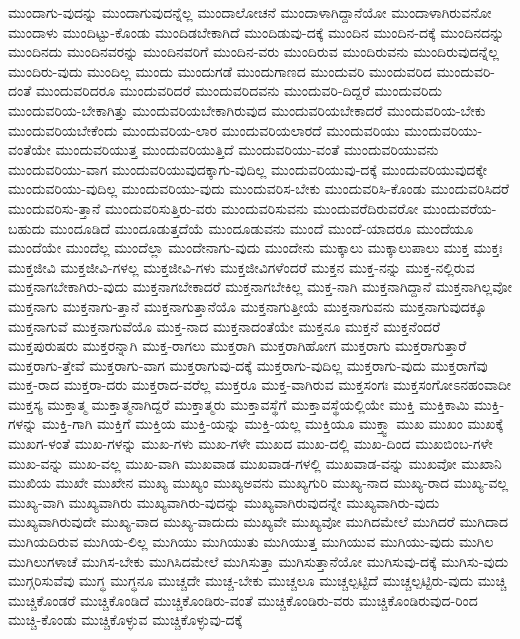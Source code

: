 {ಮುಂದಾಗು-ವುದನ್ನು
ಮುಂದಾಗುವುದನ್ನೆಲ್ಲ
ಮುಂದಾಲೋಚನೆ
ಮುಂದಾಳಾಗಿದ್ದಾನೆಯೋ
ಮುಂದಾಳಾಗಿರುವನೋ
ಮುಂದಾಳು
ಮುಂದಿಟ್ಟು-ಕೊಂಡು
ಮುಂದಿಡಬೇಕಾಗಿದೆ
ಮುಂದಿಡುವು-ದಕ್ಕೆ
ಮುಂದಿನ
ಮುಂದಿನ-ದಕ್ಕೆ
ಮುಂದಿನದನ್ನು
ಮುಂದಿನದು
ಮುಂದಿನವರನ್ನು
ಮುಂದಿನವರಿಗೆ
ಮುಂದಿನ-ವರು
ಮುಂದಿರುವ
ಮುಂದಿರುವನು
ಮುಂದಿರುವುದನ್ನೆಲ್ಲ
ಮುಂದಿರು-ವುದು
ಮುಂದಿಲ್ಲ
ಮುಂದು
ಮುಂದುಗಡೆ
ಮುಂದುಗಾಣದ
ಮುಂದುವರಿ
ಮುಂದುವರಿದ
ಮುಂದುವರಿ-ದಂತೆ
ಮುಂದುವರಿದರೂ
ಮುಂದುವರಿದರೆ
ಮುಂದುವರಿದವನು
ಮುಂದುವರಿ-ದಿದ್ದರೆ
ಮುಂದುವರಿದು
ಮುಂದುವರಿಯ-ಬೇಕಾಗಿತ್ತು
ಮುಂದುವರಿಯಬೇಕಾಗಿರುವುದ
ಮುಂದುವರಿಯಬೇಕಾದರೆ
ಮುಂದುವರಿಯ-ಬೇಕು
ಮುಂದುವರಿಯಬೇಕೆಂದು
ಮುಂದುವರಿಯ-ಲಾರ
ಮುಂದುವರಿಯಲಾರದೆ
ಮುಂದುವರಿಯು
ಮುಂದುವರಿಯು-ವಂತೆಯೇ
ಮುಂದುವರಿಯುತ್ತ
ಮುಂದುವರಿಯುತ್ತಿದೆ
ಮುಂದುವರಿಯು-ವಂತೆ
ಮುಂದುವರಿಯುವನು
ಮುಂದುವರಿಯು-ವಾಗ
ಮುಂದುವರಿಯುವುದಕ್ಕಾಗು-ವುದಿಲ್ಲ
ಮುಂದುವರಿಯುವು-ದಕ್ಕೆ
ಮುಂದುವರಿಯುವುದಕ್ಕೇ
ಮುಂದುವರಿಯು-ವುದಿಲ್ಲ
ಮುಂದುವರಿಯು-ವುದು
ಮುಂದುವರಿಸ-ಬೇಕು
ಮುಂದುವರಿಸಿ-ಕೊಂಡು
ಮುಂದುವರಿಸಿದರೆ
ಮುಂದುವರಿಸು-ತ್ತಾನೆ
ಮುಂದುವರಿಸುತ್ತಿರು-ವರು
ಮುಂದುವರಿಸುವನು
ಮುಂದುವರೆದಿರುವರೋ
ಮುಂದುವರೆಯ-ಬಹುದು
ಮುಂದೂಡಿದೆ
ಮುಂದೂಡುತ್ತದೆಯೆ
ಮುಂದೂಡುವನು
ಮುಂದೆ
ಮುಂದೆ-ಯಾದರೂ
ಮುಂದೆಯೂ
ಮುಂದೆಯೇ
ಮುಂದೆಲ್ಲ
ಮುಂದೆಲ್ಲಾ
ಮುಂದೇನಾಗು-ವುದು
ಮುಂದೇನು
ಮುಕ್ಕಾಲು
ಮುಕ್ಕಾಲುಪಾಲು
ಮುಕ್ತ
ಮುಕ್ತಃ
ಮುಕ್ತಜೀವಿ
ಮುಕ್ತಜೀವಿ-ಗಳಲ್ಲ
ಮುಕ್ತಜೀವಿ-ಗಳು
ಮುಕ್ತಜೀವಿಗಳೆಂದರೆ
ಮುಕ್ತನ
ಮುಕ್ತ-ನನ್ನು
ಮುಕ್ತ-ನಲ್ಲಿರುವ
ಮುಕ್ತನಾಗಬೇಕಾಗಿರು-ವುದು
ಮುಕ್ತನಾಗಬೇಕಾದರೆ
ಮುಕ್ತನಾಗಬೇಕಿಲ್ಲ
ಮುಕ್ತ-ನಾಗಿ
ಮುಕ್ತನಾಗಿದ್ದಾನೆ
ಮುಕ್ತನಾಗಿಲ್ಲವೋ
ಮುಕ್ತನಾಗು
ಮುಕ್ತನಾಗು-ತ್ತಾನೆ
ಮುಕ್ತನಾಗುತ್ತಾನೆಯೊ
ಮುಕ್ತನಾಗುತ್ತೀಯೆ
ಮುಕ್ತನಾಗುವನು
ಮುಕ್ತನಾಗುವುದಕ್ಕೂ
ಮುಕ್ತನಾಗುವೆ
ಮುಕ್ತನಾಗುವೆಯೊ
ಮುಕ್ತ-ನಾದ
ಮುಕ್ತನಾದಂತೆಯೇ
ಮುಕ್ತನೂ
ಮುಕ್ತನೆ
ಮುಕ್ತನೆಂದರೆ
ಮುಕ್ತಪುರುಷರು
ಮುಕ್ತರನ್ನಾಗಿ
ಮುಕ್ತ-ರಾಗಲು
ಮುಕ್ತರಾಗಿ
ಮುಕ್ತರಾಗಿಹೋಗ
ಮುಕ್ತರಾಗು
ಮುಕ್ತರಾಗುತ್ತಾರೆ
ಮುಕ್ತರಾಗು-ತ್ತೇವೆ
ಮುಕ್ತರಾಗು-ವಾಗ
ಮುಕ್ತರಾಗುವು-ದಕ್ಕೆ
ಮುಕ್ತರಾಗು-ವುದಿಲ್ಲ
ಮುಕ್ತರಾಗು-ವುದು
ಮುಕ್ತರಾಗೆವು
ಮುಕ್ತ-ರಾದ
ಮುಕ್ತರಾ-ದರು
ಮುಕ್ತರಾದ-ವರೆಲ್ಲ
ಮುಕ್ತರೂ
ಮುಕ್ತ-ವಾಗಿರುವ
ಮುಕ್ತಸಂಗಃ
ಮುಕ್ತಸಂಗೋಽನಹಂವಾದೀ
ಮುಕ್ತಸ್ಯ
ಮುಕ್ತಾತ್ಮ
ಮುಕ್ತಾತ್ಮನಾಗಿದ್ದರೆ
ಮುಕ್ತಾತ್ಮರು
ಮುಕ್ತಾವಸ್ಥೆಗೆ
ಮುಕ್ತಾವಸ್ಥೆಯಲ್ಲಿಯೇ
ಮುಕ್ತಿ
ಮುಕ್ತಿಕಾಮಿ
ಮುಕ್ತಿ-ಗಳನ್ನು
ಮುಕ್ತಿ-ಗಾಗಿ
ಮುಕ್ತಿಗೆ
ಮುಕ್ತಿಯ
ಮುಕ್ತಿ-ಯನ್ನು
ಮುಕ್ತಿ-ಯಲ್ಲ
ಮುಕ್ತಿಯೂ
ಮುಕ್ತ್ವಾ
ಮುಖ
ಮುಖಂ
ಮುಖಕ್ಕೆ
ಮುಖಗ-ಳಂತೆ
ಮುಖ-ಗಳನ್ನು
ಮುಖ-ಗಳು
ಮುಖ-ಗಳೇ
ಮುಖದ
ಮುಖ-ದಲ್ಲಿ
ಮುಖ-ದಿಂದ
ಮುಖಬಿಂಬ-ಗಳೇ
ಮುಖ-ವನ್ನು
ಮುಖ-ವಲ್ಲ
ಮುಖ-ವಾಗಿ
ಮುಖವಾಡ
ಮುಖವಾಡ-ಗಳಲ್ಲಿ
ಮುಖವಾಡ-ವನ್ನು
ಮುಖವೋ
ಮುಖಾನಿ
ಮುಖಿಯ
ಮುಖೇ
ಮುಖೇನ
ಮುಖ್ಯ
ಮುಖ್ಯಂ
ಮುಖ್ಯಅವನು
ಮುಖ್ಯಗುರಿ
ಮುಖ್ಯ-ನಾದ
ಮುಖ್ಯ-ರಾದ
ಮುಖ್ಯ-ವಲ್ಲ
ಮುಖ್ಯ-ವಾಗಿ
ಮುಖ್ಯವಾಗಿರು
ಮುಖ್ಯವಾಗಿರು-ವುದನ್ನು
ಮುಖ್ಯವಾಗಿರುವುದನ್ನೇ
ಮುಖ್ಯವಾಗಿರು-ವುದು
ಮುಖ್ಯವಾಗಿರುವುದೇ
ಮುಖ್ಯ-ವಾದ
ಮುಖ್ಯ-ವಾದುದು
ಮುಖ್ಯವೇ
ಮುಖ್ಯವೋ
ಮುಗಿದಮೇಲೆ
ಮುಗಿದರೆ
ಮುಗಿದಾದ
ಮುಗಿಯದಿರುವ
ಮುಗಿಯ-ಲಿಲ್ಲ
ಮುಗಿಯು
ಮುಗಿಯುತು
ಮುಗಿಯುತ್ತ
ಮುಗಿಯುವ
ಮುಗಿಯು-ವುದು
ಮುಗಿಲ
ಮುಗಿಲುಗಳಾಚೆ
ಮುಗಿಸ-ಬೇಕು
ಮುಗಿಸಿದಮೇಲೆ
ಮುಗಿಸುತ್ತಾ
ಮುಗಿಸುತ್ತಾನೆಯೋ
ಮುಗಿಸುವು-ದಕ್ಕೆ
ಮುಗಿಸು-ವುದು
ಮುಗ್ಗರಿಸುವೆವು
ಮುಗ್ಧ
ಮುಗ್ಧನೂ
ಮುಚ್ಚದೇ
ಮುಚ್ಚ-ಬೇಕು
ಮುಚ್ಚಲೂ
ಮುಚ್ಚಲ್ಪಟ್ಟಿದೆ
ಮುಚ್ಚಲ್ಪಟ್ಟಿರು-ವುದು
ಮುಚ್ಚಿ
ಮುಚ್ಚಿಕೊಂಡರೆ
ಮುಚ್ಚಿಕೊಂಡಿದೆ
ಮುಚ್ಚಿಕೊಂಡಿರು-ವಂತೆ
ಮುಚ್ಚಿಕೊಂಡಿರು-ವರು
ಮುಚ್ಚಿಕೊಂಡಿರುವುದ-ರಿಂದ
ಮುಚ್ಚಿ-ಕೊಂಡು
ಮುಚ್ಚಿಕೊಳ್ಳುವ
ಮುಚ್ಚಿಕೊಳ್ಳುವು-ದಕ್ಕೆ
}

